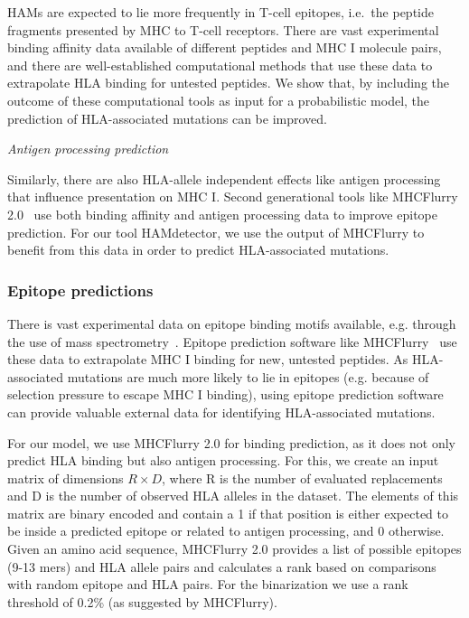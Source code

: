 \documentclass{bioinfo}
\begin{document}
\begin{methods}
    HAMs are expected to lie more frequently in T-cell epitopes, i.e.\ the peptide fragments presented by MHC to T-cell receptors. There are vast experimental binding affinity data available of different peptides and MHC I molecule pairs, and there are well-established computational methods that use these data to extrapolate HLA binding for untested peptides. We show that, by including the outcome of these computational tools as input for a probabilistic model, the prediction of HLA-associated mutations can be improved.

  \textit{Antigen processing prediction}
  
    Similarly, there are also HLA-allele independent effects like antigen processing that influence presentation on MHC I. Second generational tools like MHCFlurry 2.0~\citep{ODonnell2020} use both binding affinity and antigen processing data to improve epitope prediction. For our tool HAMdetector, we use the output of MHCFlurry to benefit from this data in order to predict HLA-associated mutations.

    \subsubsection{Epitope predictions}

There is vast experimental data on epitope binding motifs available, e.g. through the use of mass spectrometry~\citep{Hunt1992}. Epitope prediction software like MHCFlurry~\citep{ODonnell2020} use these data to extrapolate MHC I binding for new, untested peptides.
As HLA-associated mutations are much more likely to lie in epitopes (e.g. because of selection pressure to escape MHC I binding), using epitope prediction software can provide valuable external data for identifying HLA-associated mutations.

For our model, we use MHCFlurry 2.0 for binding prediction, as it does not only predict HLA binding but also antigen processing. For this, we create an input matrix of dimensions \(R\times D\), where R is the number of evaluated replacements and D is the number of observed HLA alleles in the dataset. The elements of this matrix are binary encoded and contain a 1 if that position is either expected to be inside a predicted epitope or related to antigen processing, and 0 otherwise. Given an amino acid sequence, MHCFlurry 2.0 provides a list of possible epitopes (9-13 mers) and HLA allele pairs and calculates a rank based on comparisons with random epitope and HLA pairs. For the binarization we use a rank threshold of 0.2\% (as suggested by MHCFlurry).


\end{methods}
\end{document}
